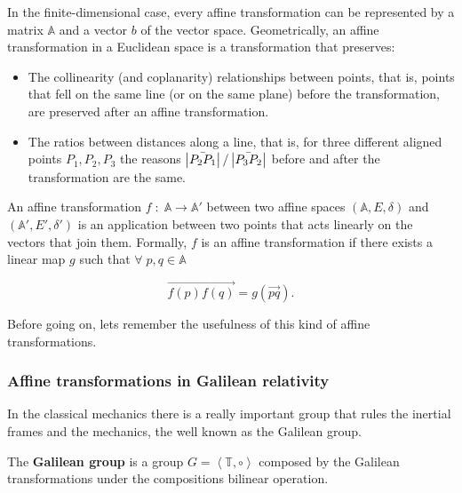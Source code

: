          In the finite-dimensional case, every affine transformation can be represented by a matrix $\mathbb{A}$ and a vector $b$ of the vector space. Geometrically, an affine transformation in a Euclidean space is a transformation that preserves:

         \begin{itemize}
             \item The collinearity (and coplanarity) relationships between points, that is, points that fell on the same line (or on the same plane) before the transformation, are preserved after an affine transformation.

             \item The ratios between distances along a line, that is, for three different aligned points $P_1,P_2,P_3$ the reasons $\left|\Bar{P_2P_1}\right|/\left|\Bar{P_3P_2}\right|$ before and after the transformation are the same.
         \end{itemize}

         An affine transformation  $f\;:\; \mathbb{A} \rightarrow \mathbb{A}'$ between two affine spaces $\left(\mathbb{A},E,\delta \right)$ and $\left(\mathbb{A}',E',\delta' \right)$ is an application between two points that acts linearly on the vectors that join them. Formally, $f$ is an affine transformation if there exists a linear map $g$ such that $\forall\;p,q\in\mathbb{A}$

         \begin{equation}
             \Vec{f(p)f(q)} = g\left(\Vec{pq}\right).
         \end{equation}

         Before going on, lets remember the usefulness of this kind of affine transformations.
            \subsubsection{Affine transformations in Galilean relativity}

                In the classical mechanics there is a really important group that rules the inertial frames and the mechanics, the well known as the Galilean group.

                \begin{myDef}
                    The \textbf{Galilean group} is a group $G = \left<\mathbb{T},\circ\right>$ composed by the Galilean transformations under the compositions bilinear operation. 
                \end{myDef}

